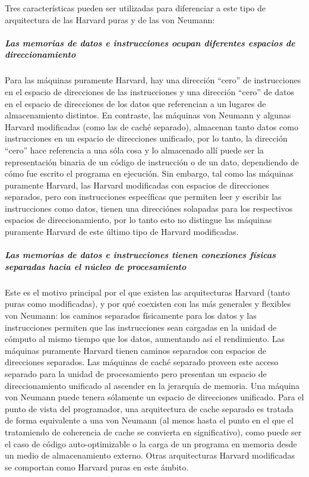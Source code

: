 Tres características pueden ser utilizadas para diferenciar a este tipo de arquitectura de las Harvard puras y de las von Neumann:\\

\subparagraph{Las memorias de datos e instrucciones ocupan diferentes espacios de direccionamiento}

Para las máquinas puramente Harvard, hay una dirección ``cero'' de instrucciones en el espacio de direcciones de las instrucciones y una dirección ``cero'' de datos en el espacio de direcciones de los datos que referencian a un lugares de almacenamiento distintos. En contraste, las máquinas von Neumann y algunas Harvard modificadas (como las de caché separado), almacenan tanto datos como instrucciones en un espacio de direcciones unificado, por lo tanto, la dirección ``cero'' hace referencia a una sóla cosa y lo almacenado allí puede ser la representación binaria de un código de instrucción o de un dato, dependiendo de cómo fue escrito el programa en ejecución. Sin embargo, tal como las máquinas puramente Harvard, las Harvard modificadas con espacios de direcciones separados, pero con instrucciones específicas que permiten leer y escribir las instrucciones como datos, tienen una direcciónes solapadas para los respectivos espacios de direccionamiento, por lo tanto esto no distingue las máquinas puramente Harvard de este último tipo de Harvard modificadas.

\subparagraph{Las memorias de datos e instrucciones tienen conexiones físicas separadas hacia el núcleo de procesamiento}

Este es el motivo principal por el que existen las arquitecturas Harvard (tanto puras como modificadas), y por qué coexisten con las más generales y flexibles von Neumann: los caminos separados físicamente para los datos y las instrucciones permiten que las instrucciones sean cargadas en la unidad de cómputo al mismo tiempo que los datos, aumentando así el rendimiento. Las máquinas puramente Harvard tienen caminos separados con espacios de direcciones separados. Las máquinas de caché separado proveen este acceso separado para la unidad de procesamiento pero presentan un espacio de direccionamiento unificado al ascender en la jerarquía de memoria. Una máquina von Neumann puede tenera sólamente un espacio de direcciones unificado. Para el punto de vista del programador, una arquitectura de cache separado es tratada de forma equivalente a una von Neumann (al menos hasta el punto en el que el tratamiendo de coherencia de cache se convierta en significativo), como puede ser el caso de código auto-optimizable o la carga de un programa en memoria desde un medio de almacenamiento externo. Otras arquitecturas Harvard modificadas se comportan como Harvard puras en este ámbito.

